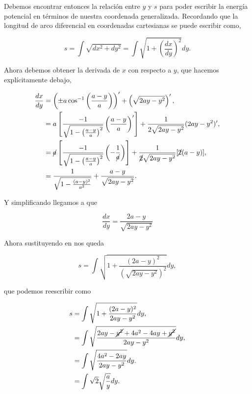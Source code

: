 \documentclass[a4paper,10pt]{article}
\numberwithin{equation}{section}
\begin{document}
Debemos encontrar entonces la relación entre $y$ y $s$ para poder escribir la energía 
potencial en términos de nuestra coordenada generalizada. Recordando que la longitud 
de arco diferencial en coordenadas cartesianas se puede escribir como,

\begin{equation}
 s = \int \sqrt{dx^2+dy^2} = \int \sqrt{1+\left( \frac{dx}{dy} \right)^2} dy.
 \label{eq:arcoCartesiano}
\end{equation}

Ahora debemos obtener la derivada de $x$ con respecto a $y$, que hacemos explícitamente 
debajo,

\begin{align}
 \begin{split}
  \frac{dx}{dy} &= \left(\pm a \cos^{-1}{\left(\frac{a-y}{a}\right)}\right)' + 
  \left(\sqrt{2ay-y^2}\right)', \\
		&= a \left[ \frac{-1}{\sqrt{1 - \left(\frac{a-y}{a} \right)^2}}
		\left(\frac{a-y}{a} \right)'\right] + \frac{1}{2\sqrt{2ay-y^2}}
		(2ay - y^2)', \\
		&= \cancel{a}\left[ \frac{-1}{\sqrt{1 - \left(\frac{a-y}{a} \right)^2}}
		\left(- \frac{1}{\cancel{a}} \right) \right] + \frac{1}{\cancel{2}\sqrt{2ay-y^2}}
		[\cancel{2}(a - y)], \\
		&= \frac{1}{\sqrt{1 - \frac{(a-y)^2}{a^2}}} + \frac{a-y}{\sqrt{2ay - y^2}}.
 \end{split}
\end{align}

Y simplificando llegamos a que 

\begin{equation}
 \frac{dx}{dy} = \frac{2a - y}{\sqrt{2ay - y^2}}
 \label{eq:dxdyCiclo}
\end{equation}

Ahora sustituyendo  en  nos queda 

\begin{equation}
 s = \int \sqrt{1 + \frac{(2a - y)^2}{(\sqrt{2ay - y^2})^2}} dy,
\end{equation}

que podemos reescribir como

\begin{align}
\begin{split}
 s &= \int \sqrt{1 + \frac{(2a - y)^2}{2ay - y^2}} dy, \\
   &= \int \sqrt{\frac{2ay - \cancel{ y^2} + 4a^2 - 4ay + \cancel{y^2}}{2ay - y^2}} dy, \\  
   &= \int \sqrt{\frac{4a^2 -2ay}{2ay - y^2}} dy.  \\
   &= \int \sqrt{2} \sqrt{\frac{a}{y}} dy.
 \end{split}
\end{align}
\end{document}
